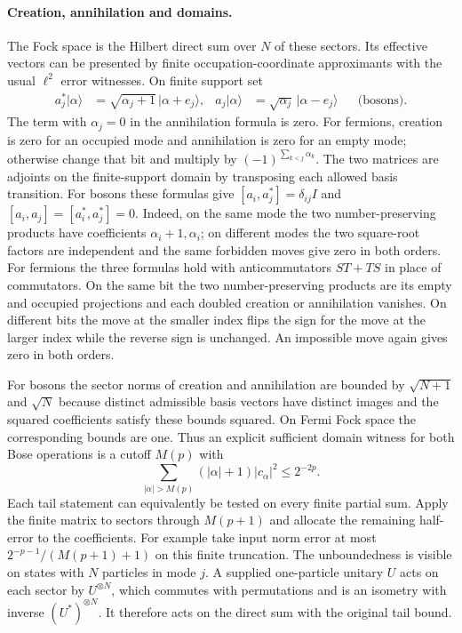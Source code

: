 \paragraph{Creation, annihilation and domains.}
The Fock space is the Hilbert direct sum over \(N\) of these sectors.
Its effective vectors can be presented by finite occupation-coordinate
approximants with the usual \(\ell^2\) error witnesses. On finite
support set
\[
 \begin{aligned}
 a_j^*|\alpha\rangle&=\sqrt{\alpha_j+1}\,|\alpha+e_j\rangle,&
 a_j|\alpha\rangle&=\sqrt{\alpha_j}\,|\alpha-e_j\rangle
 &&\text{(bosons)} .
 \end{aligned}
\]
The term with \(\alpha_j=0\) in the annihilation formula is zero. For
fermions, creation is zero for an occupied mode and annihilation is zero
for an empty mode; otherwise change that bit and multiply by
\((-1)^{\sum_{k<j}\alpha_k}\). The two matrices are adjoints on the
finite-support domain by transposing each allowed basis transition.
For bosons these formulas give \([a_i,a_j^*]=\delta_{ij}I\) and
\([a_i,a_j]=[a_i^*,a_j^*]=0\). Indeed, on the same mode the two
number-preserving products have coefficients \(\alpha_i+1,\alpha_i\);
on different modes the two square-root factors are independent and the
same forbidden moves give zero in both orders. For fermions the
three formulas hold with anticommutators \(ST+TS\) in place of
commutators. On the same bit the two number-preserving products are its
empty and occupied projections and each doubled creation or annihilation
vanishes. On different bits the move at the smaller index flips the
sign for the move at the larger index while the reverse sign is unchanged.
An impossible move again gives zero in both orders.

For bosons the sector norms of creation and annihilation are bounded by
\(\sqrt{N+1}\) and \(\sqrt N\) because distinct admissible basis
vectors have distinct images and the squared coefficients satisfy these
bounds squared. On Fermi Fock space the corresponding bounds are one.
Thus an explicit sufficient domain witness for both Bose operations
is a cutoff \(M(p)\) with
\[
           \sum_{|\alpha|>M(p)} (|\alpha|+1)|c_\alpha|^2\le2^{-2p}.
\]
Each tail statement can equivalently be tested on every finite partial
sum. Apply the finite matrix to sectors through \(M(p+1)\) and allocate
the remaining half-error to the coefficients. For example take input
norm error at most \(2^{-p-1}/(M(p+1)+1)\) on this finite truncation.
The unboundedness is visible on states with \(N\) particles in mode
\(j\). A supplied one-particle unitary \(U\) acts on each sector by
\(U^{\otimes N}\), which commutes with permutations and is an isometry
with inverse \((U^*)^{\otimes N}\). It therefore acts on the direct sum
with the original tail bound.

